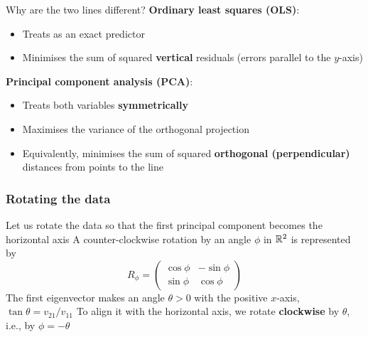 \documentclass[aspectratio=169]{beamer}\usepackage[]{graphicx}\usepackage[]{xcolor}
\begin{document}


\begin{frame}{Why are the two lines different?}
\textbf{Ordinary least squares (OLS)}:
\begin{itemize}
\item Treats  as an exact predictor
\item Minimises the sum of squared \textbf{vertical} residuals (errors parallel to the $y$-axis)
\end{itemize}
\vfill
\textbf{Principal component analysis (PCA)}:
\begin{itemize}
\item Treats both variables \textbf{symmetrically}
\item Maximises the variance of the orthogonal projection
\item Equivalently, minimises the sum of squared \textbf{orthogonal (perpendicular)} distances from points to the line
\end{itemize}
\end{frame}


\begin{frame}\frametitle{Rotating the data}
Let us rotate the data so that the first principal component becomes the horizontal axis
\vfill
A counter-clockwise rotation by an angle $\phi$ in $\mathbb{R}^2$ is represented by
\[
R_\phi = \begin{pmatrix} \cos\phi & -\sin\phi \\ \sin\phi & \cos\phi \end{pmatrix}
\]
\vfill
The first eigenvector makes an angle $\theta > 0$ with the positive $x$-axis, $\tan\theta = v_{21}/v_{11}$
\vfill
To align it with the horizontal axis, we rotate \textbf{clockwise} by $\theta$, i.e., by $\phi = -\theta$
\end{frame}
\end{document}
